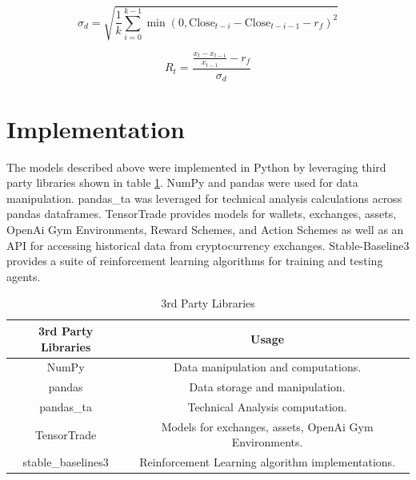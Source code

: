 \documentclass[journal]{new-aiaa}
\begin{document}
\begin{equation}\label{eq:Sortino_Ratio_Downside_Deviation}
        \sigma_d = \sqrt{\frac{1}{k} \sum_{i=0}^{k-1} \min\left(0, \text{Close}_{t-i} - \text{Close}_{t-i-1} - r_f\right)^2}
\end{equation}

\begin{equation}\label{eq:Sortino_Ratio_Reward_Function}
        R_t = \frac{\frac{x_{t} - x_{t-1}}{x_{t-1}} - r_f}{\sigma_d}
\end{equation}

\section{Implementation}\label{sec:Implementation}
The models described above were implemented in Python by leveraging third party libraries shown in table \ref{tab:3rd_Party_Libraries}.
NumPy and pandas were used for data manipulation.
pandas\_ta was leveraged for technical analysis calculations across pandas dataframes.
TensorTrade provides models for wallets, exchanges, assets, OpenAi Gym Environments, Reward Schemes, and Action Schemes as well as an API for accessing historical data from cryptocurrency exchanges.
Stable-Baseline3 provides a suite of reinforcement learning algorithms for training and testing agents.

\begin{table}[H]
        \centering
        \begin{tabular}{|c|c|}
                \hline
                \textbf{3rd Party Libraries} & \textbf{Usage} \\
                \hline
                \hline
                NumPy \cite{harris2020array} & Data manipulation and computations. \\
                \hline
                pandas \cite{reback2020pandas} & Data storage and manipulation. \\
                \hline
                pandas\_ta \cite{pandas-ta} & Technical Analysis computation. \\
                \hline
                TensorTrade \cite{Tensortrade} & Models for exchanges, assets, OpenAi Gym Environments. \\
                \hline
                stable\_baselines3 \cite{stable-baselines3} & Reinforcement Learning algorithm implementations. \\
                \hline
        \end{tabular}
        \caption{3rd Party Libraries}
        \label{tab:3rd_Party_Libraries}
\end{table}
\end{document}
